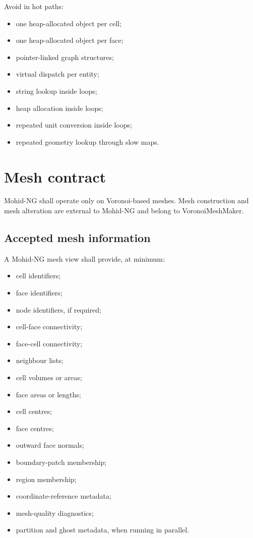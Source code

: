 \documentclass[11pt,a4paper]{article}
\begin{document}
Avoid in hot paths:

\begin{itemize}
  \item one heap-allocated object per cell;
  \item one heap-allocated object per face;
  \item pointer-linked graph structures;
  \item virtual dispatch per entity;
  \item string lookup inside loops;
  \item heap allocation inside loops;
  \item repeated unit conversion inside loops;
  \item repeated geometry lookup through slow maps.
\end{itemize}

\section{Mesh contract}

Mohid-NG shall operate only on Voronoi-based meshes. Mesh construction and mesh alteration are external to Mohid-NG and belong to VoronoiMeshMaker.

\subsection{Accepted mesh information}

A Mohid-NG mesh view shall provide, at minimum:

\begin{itemize}
  \item cell identifiers;
  \item face identifiers;
  \item node identifiers, if required;
  \item cell-face connectivity;
  \item face-cell connectivity;
  \item neighbour lists;
  \item cell volumes or areas;
  \item face areas or lengths;
  \item cell centres;
  \item face centres;
  \item outward face normals;
  \item boundary-patch membership;
  \item region membership;
  \item coordinate-reference metadata;
  \item mesh-quality diagnostics;
  \item partition and ghost metadata, when running in parallel.
\end{itemize}
\end{document}
